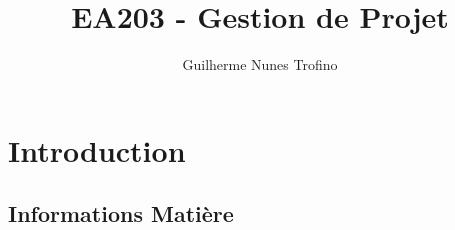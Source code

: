 \documentclass{article}
\title{EA203 - Gestion de Projet}
\author{Guilherme Nunes Trofino}
\begin{document}
\maketitle


\newpage\tableofcontents

\section{Introduction}

% 


\subsection{Informations Matière}
\end{document}

